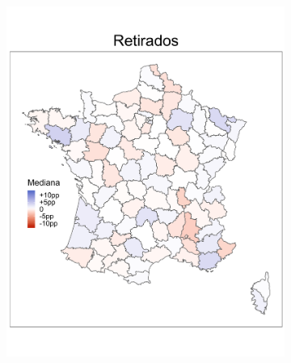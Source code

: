 \begin{figure}
\begin{subfigure}{0.235\textwidth}
	\includegraphics[width = \textwidth]{Figs/Efectos/Mapa_Efectos_CSP7_Modelo_H}
	\end{subfigure}
	~
	\begin{subfigure}{0.235\textwidth}

\end{subfigure}
\end{figure}
